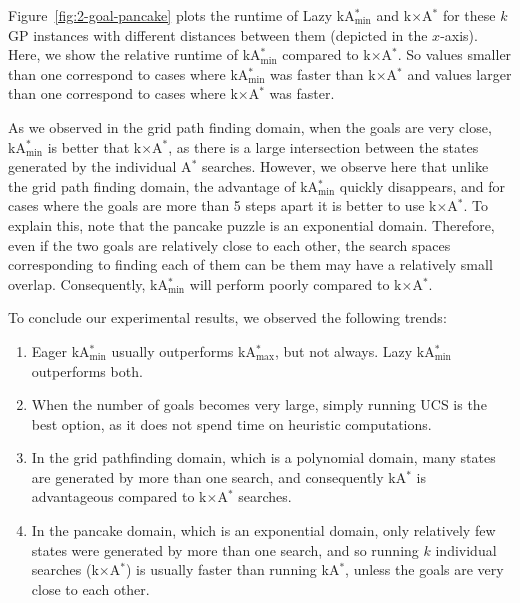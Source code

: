 \documentclass[twoside,11pt]{article}
\newcommand{\kgs}{$k$GP\xspace}
\newcommand{\astar}{A$^*$\xspace}
\newcommand{\kastar}{kA$^*$\xspace}
\newcommand{\kastarvar}[1]{\textup{kA}$^*_{#1}$\xspace}
\newcommand{\kastarmin}{\kastarvar{\min}}
\newcommand{\kastarmax}{\kastarvar{\max}}
\newcommand{\kxastar}{k$\times$A$^*$\xspace}
\begin{document}

Figure~\ref{fig:2-goal-pancake} plots the runtime of Lazy \kastarmin and \kxastar for these \kgs instances with different distances between them (depicted in the $x$-axis).
Here, we show the relative runtime of \kastarmin compared to \kxastar.
So values smaller than one correspond to cases where \kastarmin was faster than \kxastar and values larger than one correspond to cases where \kxastar was faster.

As we observed in the grid path finding domain, when the goals are very close, \kastarmin is better that \kxastar, as there is a large intersection between the states generated by the individual \astar searches.
However, we observe here that unlike the grid path finding domain, the advantage of \kastarmin quickly disappears, and for cases where the goals are more than 5 steps apart it is better to use \kxastar.
To explain this, note that the pancake puzzle is an exponential domain.
Therefore, even if the two goals are relatively close to each other, the search spaces corresponding to finding each of them can be them may have a relatively small overlap.
Consequently, \kastarmin will perform poorly compared to \kxastar.


To conclude our experimental results, we observed the following trends:
\begin{enumerate}
  \item Eager \kastarmin usually outperforms \kastarmax, but not always.
  Lazy \kastarmin outperforms both.
  \item When the number of goals becomes very large, simply running UCS is the best option, as it does not spend time on heuristic computations.
  \item In the grid pathfinding domain, which is a polynomial domain, many states are generated by more than one search, and consequently \kastar is advantageous compared to \kxastar searches.
  \item In the pancake domain, which is an exponential domain, only relatively few states were generated by more than one search, and so running $k$ individual searches (\kxastar) is usually faster than running \kastar, unless the goals are very close to each other.
\end{enumerate}
\end{document}
